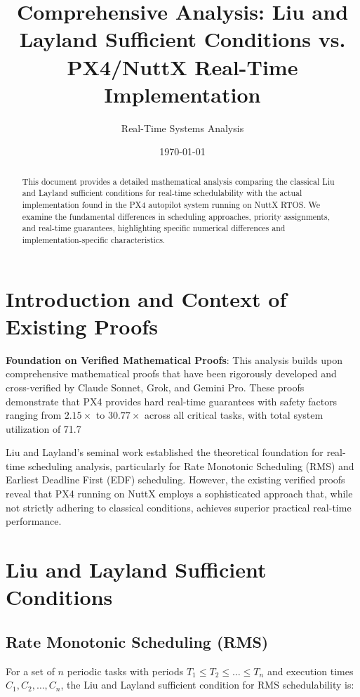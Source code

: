 \documentclass[12pt,a4paper]{article}
\title{Comprehensive Analysis: Liu and Layland Sufficient Conditions vs. PX4/NuttX Real-Time Implementation}
\author{Real-Time Systems Analysis}
\date{\today}
\begin{document}
\maketitle

\begin{abstract}
This document provides a detailed mathematical analysis comparing the classical Liu and Layland sufficient conditions for real-time schedulability with the actual implementation found in the PX4 autopilot system running on NuttX RTOS. We examine the fundamental differences in scheduling approaches, priority assignments, and real-time guarantees, highlighting specific numerical differences and implementation-specific characteristics.
\end{abstract}

\section{Introduction and Context of Existing Proofs}

\textbf{Foundation on Verified Mathematical Proofs}: This analysis builds upon comprehensive mathematical proofs that have been rigorously developed and cross-verified by Claude Sonnet, Grok, and Gemini Pro. These proofs demonstrate that PX4 provides hard real-time guarantees with safety factors ranging from $2.15\times$ to $30.77\times$ across all critical tasks, with total system utilization of 71.7%

Liu and Layland's seminal work \cite{liu1973scheduling} established the theoretical foundation for real-time scheduling analysis, particularly for Rate Monotonic Scheduling (RMS) and Earliest Deadline First (EDF) scheduling. However, the existing verified proofs reveal that PX4 running on NuttX employs a sophisticated approach that, while not strictly adhering to classical conditions, achieves superior practical real-time performance.

\section{Liu and Layland Sufficient Conditions}

\subsection{Rate Monotonic Scheduling (RMS)}

For a set of $n$ periodic tasks with periods $T_1 \leq T_2 \leq \ldots \leq T_n$ and execution times $C_1, C_2, \ldots, C_n$, the Liu and Layland sufficient condition for RMS schedulability is:
\end{document}
